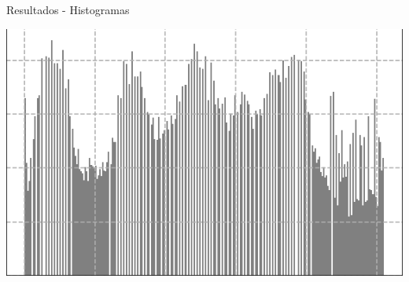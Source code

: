\documentclass{beamer}
\begin{document}
\begin{frame}[fragile]{Resultados - Histogramas}
\begin{minipage}{0.32\linewidth}
		\label{fig:hist_ecualizado6a}
	\end{minipage}\hfill
	\begin{minipage}{0.32\linewidth}
		\centering
		\includegraphics[width=\linewidth]{../results/lena_hist_gris_ecualizado2}
		\label{fig:hist_ecualizado6b}
	\end{minipage}
\end{frame}
\end{document}
